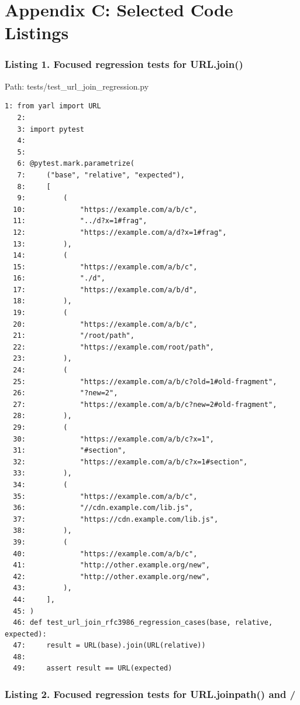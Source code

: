 \documentclass[11pt,a4paper]{article}
\begin{document}
\section*{Appendix C: Selected Code Listings}


\subsubsection*{Listing 1. Focused regression tests for URL.join()}


Path: tests/test\_url\_join\_regression.py


\begin{Verbatim}[breaklines=true,fontsize=\scriptsize]
1: from yarl import URL
   2: 
   3: import pytest
   4: 
   5: 
   6: @pytest.mark.parametrize(
   7:     ("base", "relative", "expected"),
   8:     [
   9:         (
  10:             "https://example.com/a/b/c",
  11:             "../d?x=1#frag",
  12:             "https://example.com/a/d?x=1#frag",
  13:         ),
  14:         (
  15:             "https://example.com/a/b/c",
  16:             "./d",
  17:             "https://example.com/a/b/d",
  18:         ),
  19:         (
  20:             "https://example.com/a/b/c",
  21:             "/root/path",
  22:             "https://example.com/root/path",
  23:         ),
  24:         (
  25:             "https://example.com/a/b/c?old=1#old-fragment",
  26:             "?new=2",
  27:             "https://example.com/a/b/c?new=2#old-fragment",
  28:         ),
  29:         (
  30:             "https://example.com/a/b/c?x=1",
  31:             "#section",
  32:             "https://example.com/a/b/c?x=1#section",
  33:         ),
  34:         (
  35:             "https://example.com/a/b/c",
  36:             "//cdn.example.com/lib.js",
  37:             "https://cdn.example.com/lib.js",
  38:         ),
  39:         (
  40:             "https://example.com/a/b/c",
  41:             "http://other.example.org/new",
  42:             "http://other.example.org/new",
  43:         ),
  44:     ],
  45: )
  46: def test_url_join_rfc3986_regression_cases(base, relative, expected):
  47:     result = URL(base).join(URL(relative))
  48: 
  49:     assert result == URL(expected)
\end{Verbatim}


\subsubsection*{Listing 2. Focused regression tests for URL.joinpath() and /}
\end{document}
